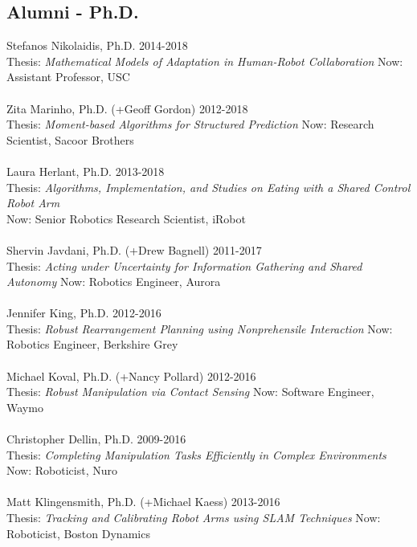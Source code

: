 \subsection{Alumni - Ph.D.}
\noindent
Stefanos Nikolaidis, Ph.D. \hfill 2014-2018\\
Thesis: \textit{Mathematical Models of Adaptation in Human-Robot Collaboration} \hfill
Now: Assistant Professor, USC\\
\\
Zita Marinho, Ph.D. (+Geoff Gordon) \hfill 2012-2018\\
Thesis: \textit{Moment-based Algorithms for Structured Prediction}\hfill
Now: Research Scientist, Sacoor Brothers\\
\\
Laura Herlant, Ph.D. \hfill 2013-2018\\
Thesis: \textit{Algorithms, Implementation, and Studies on Eating with a Shared Control Robot Arm}
\\
\phantom{a}\hfill Now: Senior Robotics Research Scientist, iRobot\\
\\
Shervin Javdani, Ph.D. (+Drew Bagnell) \hfill 2011-2017\\
Thesis: \textit{Acting under Uncertainty for Information Gathering and Shared Autonomy } \hfill Now: Robotics Engineer, Aurora\\
\\
Jennifer King, Ph.D. \hfill 2012-2016\\
Thesis: \textit{Robust Rearrangement Planning using Nonprehensile Interaction} \hfill Now: Robotics Engineer, Berkshire Grey\\
\\
Michael Koval, Ph.D. (+Nancy Pollard) \hfill 2012-2016\\
Thesis: \textit{Robust Manipulation via Contact Sensing} \hfill Now: Software Engineer, Waymo\\
\\
Christopher Dellin, Ph.D. \hfill 2009-2016\\
Thesis: \textit{Completing Manipulation Tasks Efficiently in Complex Environments} \hfill Now: Roboticist, Nuro\\
\\
Matt Klingensmith, Ph.D. (+Michael Kaess) \hfill 2013-2016\\
Thesis: \textit{Tracking and Calibrating Robot Arms using SLAM Techniques} \hfill Now: Roboticist, Boston Dynamics\\
\\
